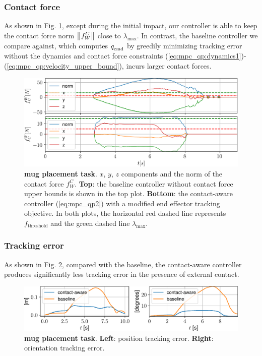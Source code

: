 \subsubsection{Contact force}
As shown in Fig. \ref{fig:mug_placement_damped_lsq_vs_ours}, except during the initial impact, our controller is able to keep the contact force norm $\left\lVert{{}^{}{f}^{C}_{W}}\right\rVert$ close to $\lambda_\text{max}$. In contrast, the baseline controller we compare against, which computes $q_{\text{cmd}}^{}$ by greedily minimizing tracking error without the dynamics and contact force constraints (\ref{eq:mpc_qp:dynamics1})-(\ref{eq:mpc_qp:velocity_upper_bound}), incurs larger contact forces.

\begin{figure}
\centering
\includegraphics[width=0.98\linewidth]{figures/04_control/mug_placement_force.png}
\caption{ \textbf{mug placement task}. $x$, $y$, $z$ components and the norm of the contact force $f_W^C$. \textbf{Top}: the baseline controller without contact force upper bounds is shown in the top plot. \textbf{Bottom}: the contact-aware controller (\ref{eq:mpc_qp2}) with a modified end effector tracking objective. In both plots, the horizontal red dashed line represents $f_\text{threshold}$ and the green dashed line $\lambda_\text{max}$.}
\label{fig:mug_placement_damped_lsq_vs_ours}
\end{figure}

\subsubsection{Tracking error}
As shown in Fig. \ref{fig:mug_placement_tracking_error}, compared with the baseline, the contact-aware controller produces significantly less tracking error in the presence of external contact.

\begin{figure}
\centering
\includegraphics[width=1.0\linewidth]{figures/04_control/mug_placement_tracking_error.pdf}
\caption{\textbf{mug placement task}. \textbf{Left}: position tracking error. \textbf{Right}: orientation tracking error. }
\label{fig:mug_placement_tracking_error}
\end{figure}

